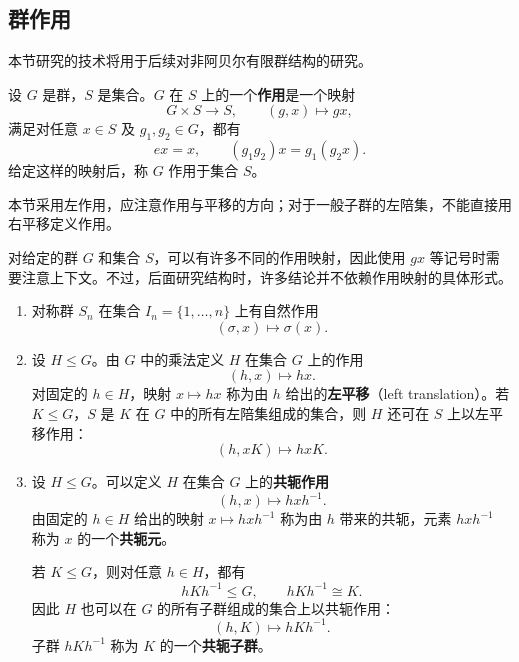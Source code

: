 \subsection{群作用}\label{sec:group-actions}


\begin{purplenote}
本节研究的技术将用于后续对非阿贝尔有限群结构的研究。
\end{purplenote}

\begin{definition}[群作用]\label{def:group-action}
设 $G$ 是群，$S$ 是集合。$G$ 在 $S$ 上的一个\textbf{作用}是一个映射
\[
  G\times S\longrightarrow S,\qquad (g,x)\longmapsto gx,
\]
满足对任意 $x\in S$ 及 $g_1,g_2\in G$，都有
\[
  ex=x,\qquad (g_1g_2)x=g_1(g_2x).
\]
给定这样的映射后，称 $G$ 作用于集合 $S$。
\end{definition}

\begin{purplenote}
本节采用左作用，应注意作用与平移的方向；对于一般子群的左陪集，不能直接用右平移定义作用。

对给定的群 $G$ 和集合 $S$，可以有许多不同的作用映射，因此使用 $gx$ 等记号时需要注意上下文。不过，后面研究结构时，许多结论并不依赖作用映射的具体形式。
\end{purplenote}

\begin{example}\label{ex:group-actions-permutations-translations-conjugation}
\begin{enumerate}[label=(\arabic*)]
  \item 对称群 $S_n$ 在集合 $I_n=\{1,\ldots,n\}$ 上有自然作用
  \[
    (\sigma,x)\longmapsto\sigma(x).
  \]

  \item 设 $H\leq G$。由 $G$ 中的乘法定义 $H$ 在集合 $G$ 上的作用
  \[
    (h,x)\longmapsto hx.
  \]
  对固定的 $h\in H$，映射 $x\mapsto hx$ 称为由 $h$ 给出的\textbf{左平移}（left translation）。若 $K\leq G$，$S$ 是 $K$ 在 $G$ 中的所有左陪集组成的集合，则 $H$ 还可在 $S$ 上以左平移作用：
  \[
    (h,xK)\longmapsto hxK.
  \]

  \item 设 $H\leq G$。可以定义 $H$ 在集合 $G$ 上的\textbf{共轭作用}
  \[
    (h,x)\longmapsto hxh^{-1}.
  \]
  由固定的 $h\in H$ 给出的映射 $x\mapsto hxh^{-1}$ 称为由 $h$ 带来的共轭，元素 $hxh^{-1}$ 称为 $x$ 的一个\textbf{共轭元}。

  若 $K\leq G$，则对任意 $h\in H$，都有
  \[
    hKh^{-1}\leq G,\qquad hKh^{-1}\cong K.
  \]
  因此 $H$ 也可以在 $G$ 的所有子群组成的集合上以共轭作用：
  \[
    (h,K)\longmapsto hKh^{-1}.
  \]
  子群 $hKh^{-1}$ 称为 $K$ 的一个\textbf{共轭子群}。
\end{enumerate}
\end{example}

